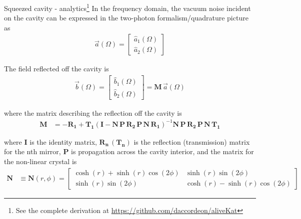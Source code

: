 \documentclass[12pt]{beamer}
\begin{document}
\begin{frame}{Squeezed cavity - analytics\footnote{\tiny See the complete derivation at {\color{blue}\url{https://github.com/daccordeon/aliveKat}}}}
\tiny
In the frequency domain, the vacuum noise incident on the cavity can be expressed in the two-photon formalism/quadrature picture as
\begin{align}
\vec{a}(\Omega) = \begin{bmatrix}
    \hat{a}_1(\Omega) \\
    \hat{a}_2(\Omega)
\end{bmatrix}
\end{align}

The field reflected off the cavity is
\begin{align}
\vec{b}(\Omega) = \begin{bmatrix}
    \hat{b}_1(\Omega) \\
    \hat{b}_2(\Omega)
\end{bmatrix} = \mathbf{M}\, \vec{a}(\Omega)
\end{align}

where the matrix describing the reflection off the cavity is
\begin{align}
\mathbf{M} &= -\mathbf{R_1} + \mathbf{T_1} ( \mathbf{I} - \mathbf{N}\, \mathbf{P}\, \mathbf{R_2}\, \mathbf{P}\, \mathbf{N}\, \mathbf{R_1} )^{-1} \mathbf{N}\, \mathbf{P}\, \mathbf{R_2}\, \mathbf{P}\, \mathbf{N}\, \mathbf{T_1} %
\end{align}

where $\mathbf{I}$ is the identity matrix, $\mathbf{R_n}\, (\mathbf{T_n})$ is the reflection (transmission) matrix for the nth mirror, $\mathbf{P}$ is propagation across the cavity interior, and the matrix for the non-linear crystal is
\begin{align}
\mathbf{N} &\equiv \mathbf{N}(r, \phi) = \begin{bmatrix} \cosh(r) + \sinh(r) \cos(2\phi) & \sinh(r) \sin(2\phi) \\ 
                                            \sinh(r) \sin(2\phi) & \cosh(r) - \sinh(r) \cos(2\phi)
                                            \end{bmatrix}
\end{align}


\end{frame}
\end{document}
